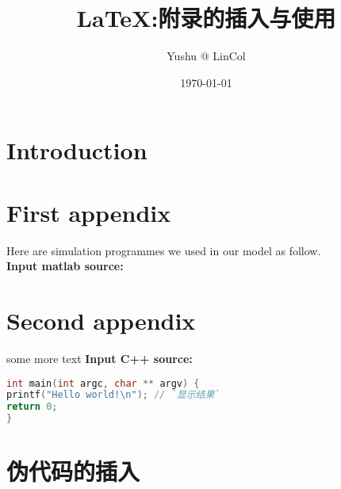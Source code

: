 \documentclass[12pt]{elegantpaper} %
\title{\LaTeX:附录的插入与使用}
\author{Yushu @ LinCol}
\date{\today}
\begin{document}
	
\maketitle
	
\newpage
	
\section{Introduction}


\newpage
\begin{appendices}
		
\section{First appendix}

Here are simulation programmes we used in our model as follow.\\

\textbf{\textcolor[rgb]{0.98,0.00,0.00}{Input matlab source:}}



\section{Second appendix}

some more text \textcolor[rgb]{0.98,0.00,0.00}{\textbf{Input C++ source:}}



\begin{lstlisting}[language=C]
int main(int argc, char ** argv) { 
printf("Hello world!\n"); // `显示结果`
return 0; 
}
\end{lstlisting}

\section{伪代码的插入}


\end{appendices}
\end{document}
